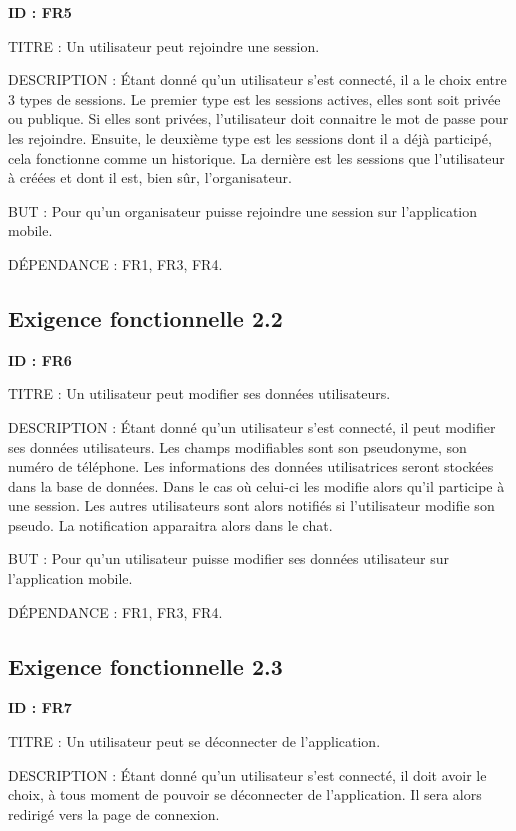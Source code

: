 \documentclass[titlepage, 12pt]{report}
\begin{document}
\textbf{ID : FR5}

TITRE : Un utilisateur peut rejoindre une session.

DESCRIPTION : Étant donné qu'un utilisateur s'est connecté, il a le choix entre 3 types de sessions. Le premier type est les sessions actives, elles sont soit privée ou publique. Si elles sont privées, l'utilisateur doit connaitre le mot de passe pour les rejoindre. Ensuite, le deuxième type est les sessions dont il a déjà participé, cela fonctionne comme un historique. La dernière est les sessions que l'utilisateur à créées et dont il est, bien sûr, l'organisateur.

BUT : Pour qu'un organisateur puisse rejoindre une session sur l'application mobile.

DÉPENDANCE : FR1, FR3, FR4.

\subsection{Exigence fonctionnelle 2.2}

\textbf{ID : FR6}

TITRE : Un utilisateur peut modifier ses données utilisateurs.

DESCRIPTION : Étant donné qu'un utilisateur s'est connecté, il peut modifier ses données utilisateurs. Les champs modifiables sont son pseudonyme, son numéro de téléphone. Les informations des données utilisatrices seront stockées dans la base de données.
Dans le cas où celui-ci les modifie alors qu'il participe à une session. Les autres utilisateurs sont alors notifiés si l'utilisateur modifie son pseudo. La notification apparaitra alors dans le chat.

BUT : Pour qu'un utilisateur puisse modifier ses données utilisateur sur l'application mobile.

DÉPENDANCE : FR1, FR3, FR4.

\subsection{Exigence fonctionnelle 2.3}

\textbf{ID : FR7}

TITRE : Un utilisateur peut se déconnecter de l'application.

DESCRIPTION : Étant donné qu'un utilisateur s'est connecté, il doit avoir le choix, à tous moment de pouvoir se déconnecter de l'application. Il sera alors redirigé vers la page de connexion.
\end{document}
